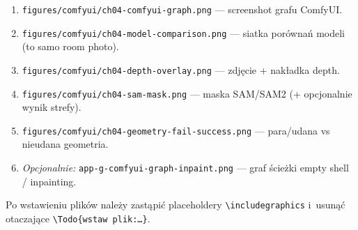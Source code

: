 \begin{enumerate}
  \item \texttt{figures/comfyui/ch04-comfyui-graph.png} --- screenshot grafu ComfyUI.
  \item \texttt{figures/comfyui/ch04-model-comparison.png} --- siatka porównań modeli (to samo room photo).
  \item \texttt{figures/comfyui/ch04-depth-overlay.png} --- zdjęcie + nakładka depth.
  \item \texttt{figures/comfyui/ch04-sam-mask.png} --- maska SAM/SAM2 (+ opcjonalnie wynik strefy).
  \item \texttt{figures/comfyui/ch04-geometry-fail-success.png} --- para/udana vs nieudana geometria.
  \item \emph{Opcjonalnie:} \texttt{app-g-comfyui-graph-inpaint.png} --- graf ścieżki empty shell / inpainting.
\end{enumerate}

Po wstawieniu plików należy zastąpić placeholdery \texttt{\textbackslash includegraphics} i~usunąć otaczające \texttt{\textbackslash Todo\{wstaw plik:\ldots\}}.
